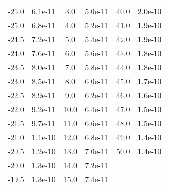 \begin{table}[h!]
\begin{tabular}{cc|cc|cc}
 -26.0 & 6.1e-11 &   3.0 &  5.0e-11 & 40.0 &  2.0e-10 \\
 -25.0 & 6.8e-11 &   4.0 &  5.2e-11 & 41.0 &  1.9e-10 \\
 -24.5 & 7.2e-11 &   5.0 &  5.4e-11 & 42.0 &  1.9e-10 \\
 -24.0 & 7.6e-11 &   6.0 &  5.6e-11 & 43.0 &  1.8e-10 \\
 -23.5 & 8.0e-11 &   7.0 &  5.8e-11 & 44.0 &  1.8e-10 \\
 -23.0 & 8.5e-11 &   8.0 &  6.0e-11 & 45.0 &  1.7e-10 \\
 -22.5 & 8.9e-11 &   9.0 &  6.2e-11 & 46.0 &  1.6e-10 \\
 -22.0 & 9.2e-11 &  10.0 &  6.4e-11 & 47.0 &  1.5e-10 \\
 -21.5 & 9.7e-11 &  11.0 &  6.6e-11 & 48.0 &   1.5e-10 \\
 -21.0 & 1.1e-10 &  12.0 &  6.8e-11 & 49.0 &  1.4e-10 \\
 -20.5 & 1.2e-10 &  13.0 &  7.0e-11&  50.0 &  1.4e-10 \\
 -20.0 & 1.3e-10 &  14.0 &  7.2e-11 & & \\
 -19.5 & 1.3e-10 &  15.0 &  7.4e-11 & &
\end{tabular}
\end{table}
